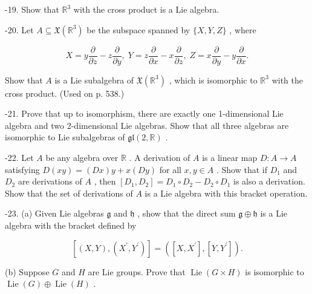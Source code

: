 \begin{exercise}
\label{prob:8-19}
-19. Show that ${\mathbb{R}}^{3}$ with the cross product is a Lie algebra.
\end{exercise}

\begin{exercise}
\label{prob:8-20}
-20. Let $A \subseteq  \mathfrak{X}\left( {\mathbb{R}}^{3}\right)$ be the subspace spanned by $\{ X, Y, Z\}$ , where

\[
X = y\frac{\partial }{\partial z} - z\frac{\partial }{\partial y},\;Y = z\frac{\partial }{\partial x} - x\frac{\partial }{\partial z},\;Z = x\frac{\partial }{\partial y} - y\frac{\partial }{\partial x}.
\]

Show that $A$ is a Lie subalgebra of $\mathfrak{X}\left( {\mathbb{R}}^{3}\right)$ , which is isomorphic to ${\mathbb{R}}^{3}$ with the cross product. (Used on p. 538.)
\end{exercise}

\begin{exercise}
\label{prob:8-21}
-21. Prove that up to isomorphism, there are exactly one 1-dimensional Lie algebra and two 2-dimensional Lie algebras. Show that all three algebras are isomorphic to Lie subalgebras of $\mathfrak{{gl}}\left( {2,\mathbb{R}}\right)$ .
\end{exercise}

\begin{exercise}
\label{prob:8-22}
-22. Let $A$ be any algebra over $\mathbb{R}$ . A derivation of $A$ is a linear map $D : A \rightarrow  A$ satisfying $D\left( {xy}\right)  = \left( {Dx}\right) y + x\left( {Dy}\right)$ for all $x, y \in  A$ . Show that if ${D}_{1}$ and ${D}_{2}$ are derivations of $A$ , then $\left\lbrack  {{D}_{1},{D}_{2}}\right\rbrack   = {D}_{1} \circ  {D}_{2} - {D}_{2} \circ  {D}_{1}$ is also a derivation. Show that the set of derivations of $A$ is a Lie algebra with this bracket operation.
\end{exercise}

\begin{exercise}
\label{prob:8-23}
-23. (a) Given Lie algebras $\mathfrak{g}$ and $\mathfrak{h}$ , show that the direct sum $\mathfrak{g} \oplus  \mathfrak{h}$ is a Lie algebra with the bracket defined by

\[
\left\lbrack  {\left( {X, Y}\right) ,\left( {{X}^{\prime },{Y}^{\prime }}\right) }\right\rbrack   = \left( {\left\lbrack  {X,{X}^{\prime }}\right\rbrack  ,\left\lbrack  {Y,{Y}^{\prime }}\right\rbrack  }\right) .
\]

(b) Suppose $G$ and $H$ are Lie groups. Prove that $\operatorname{Lie}\left( {G \times  H}\right)$ is isomorphic to $\operatorname{Lie}\left( G\right)  \oplus  \operatorname{Lie}\left( H\right)$ .
\end{exercise}


